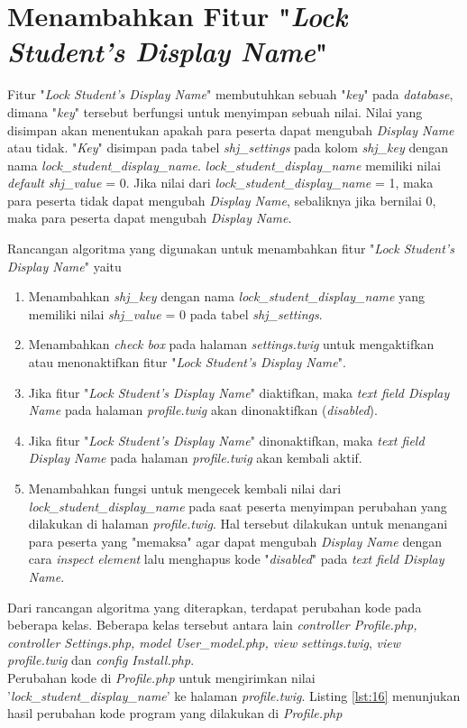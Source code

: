 \section{Menambahkan Fitur "\textit{Lock Student's Display Name}"}
\label{chap:lock}
Fitur "\textit{Lock Student's Display Name}" membutuhkan sebuah "\textit{key}" pada \textit{database}, dimana "\textit{key}" tersebut berfungsi untuk menyimpan sebuah nilai. Nilai yang disimpan akan menentukan apakah para peserta dapat mengubah \textit{Display Name} atau tidak. "\textit{Key}" disimpan pada tabel \textit{shj\_settings} pada kolom \textit{shj\_key} dengan nama \textit{lock\_student\_display\_name}. \textit{lock\_student\_display\_name} memiliki nilai \textit{default shj\_value} = 0. Jika nilai dari \textit{lock\_student\_display\_name} = 1, maka para peserta tidak dapat mengubah \textit{Display Name}, sebaliknya jika bernilai 0, maka para peserta dapat mengubah \textit{Display Name}.

Rancangan algoritma yang digunakan untuk menambahkan fitur "\textit{Lock Student's Display Name}" yaitu
\begin{enumerate}
	\item Menambahkan \textit{shj\_key} dengan nama \textit{lock\_student\_display\_name} yang memiliki nilai \textit{shj\_value} = 0 pada tabel \textit{shj\_settings}.
	\item Menambahkan \textit{check box} pada halaman \textit{settings.twig} untuk mengaktifkan atau menonaktifkan fitur "\textit{Lock Student's Display Name}".
	\item Jika fitur "\textit{Lock Student's Display Name}" diaktifkan, maka \textit{text field Display Name} pada halaman \textit{profile.twig} akan dinonaktifkan (\textit{disabled}).
	\item Jika fitur "\textit{Lock Student's Display Name}" dinonaktifkan, maka \textit{text field Display Name} pada halaman \textit{profile.twig} akan kembali aktif.
	\item Menambahkan fungsi untuk mengecek kembali nilai dari \textit{lock\_student\_display\_name} pada saat peserta menyimpan perubahan yang dilakukan di halaman \textit{profile.twig}. Hal tersebut dilakukan untuk menangani para peserta yang "memaksa" agar dapat mengubah \textit{Display Name} dengan cara \textit{inspect element} lalu menghapus kode "\textit{disabled}" pada \textit{text field Display Name}.
\end{enumerate}

Dari rancangan algoritma yang diterapkan, terdapat perubahan kode pada beberapa kelas. Beberapa kelas tersebut antara lain \textit{controller Profile.php, controller Settings.php, model User\_model.php, view settings.twig}, \textit{view profile.twig} dan \textit{config Install.php}.
~\\
Perubahan  kode di \textit{Profile.php} untuk mengirimkan nilai '\textit{lock\_student\_display\_name}' ke halaman \textit{profile.twig}. Listing \ref{lst:16} menunjukan hasil perubahan kode program yang dilakukan di \textit{Profile.php}

